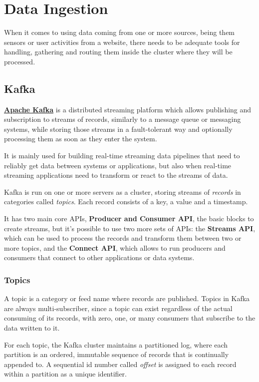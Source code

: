 \chapter{Data Ingestion}

When it comes to using data coming from one or more sources, being them sensors or user activities from a website, there needs to be adequate tools for handling, gathering and routing them inside the cluster where they will be processed.

\section{Kafka}

\textbf{\href{https://kafka.apache.org}{Apache Kafka}} \cite{kafka_doc} is a distributed streaming platform which allows publishing and subscription to streams of records, similarly to a message queue or messaging systems, while storing those streams in a fault-tolerant way and optionally processing them as soon as they enter the system. 

It is mainly used for building real-time streaming data pipelines that need to reliably get data between systems or applications, but also when real-time streaming applications need to transform or react to the streams of data.

Kafka is run on one or more servers as a cluster, storing streams of \textit{records} in categories called \textit{topics}. Each record consists of a key, a value and a timestamp.

It has two main core APIs, \textbf{Producer and Consumer API}, the basic blocks to create streams, but it's possible to use two more sets of APIs: the \textbf{Streams API}, which can be used to process the records and transform them between two or more topics, and the \textbf{Connect API}, which allows to run producers and consumers that connect to other applications or data systems.

\subsection{Topics}

A topic is a category or feed name where records are published. Topics in Kafka are always multi-subscriber, since a topic can exist regardless of the actual consuming of its records, with zero, one, or many consumers that subscribe to the data written to it.

For each topic, the Kafka cluster maintains a partitioned log, where each partition is an ordered, immutable sequence of records that is continually appended to. A sequential id number called \textit{offset} is assigned to each record within a partition as a unique identifier.

